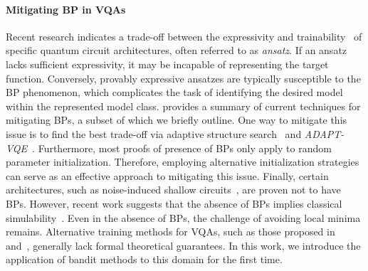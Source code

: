 \paragraph*{Mitigating BP in VQAs}
Recent research indicates a trade-off between the expressivity and trainability~\cite{Holmes_2022} of specific quantum circuit architectures, often referred to as \emph{ansatz}. If an ansatz lacks sufficient expressivity, it may be incapable of representing the target function. Conversely, provably expressive ansatzes are typically susceptible to the BP phenomenon, which complicates the task of identifying the desired model within the represented model class. 
\citet{La24} provides a summary of current techniques for mitigating BPs, a subset of which we briefly outline. One way to mitigate this issue is to find the best trade-off via adaptive structure search~\cite{Du2022} and \emph{ADAPT-VQE}~\cite{Grimsley2023}. Furthermore, most proofs of presence of BPs only apply to random parameter initialization. Therefore, employing alternative initialization strategies~\cite{NEURIPS2022_7611a3cb} can serve as an effective approach to mitigating this issue. Finally, certain architectures, such as noise-induced shallow circuits~\cite{mele2024noiseinducedshallowcircuitsabsence}, are proven not to have BPs. However, recent work suggests that the absence of BPs implies classical simulability~\cite{cerezo2024doesprovableabsencebarren}. Even in the absence of BPs, the challenge of avoiding local minima remains. Alternative training methods for VQAs, such as those proposed in~\cite{PhysRevX.7.021027} and~\cite{PhysRevA.107.032407}, generally lack formal theoretical guarantees. In this work, we introduce the application of bandit methods to this domain for the first time.